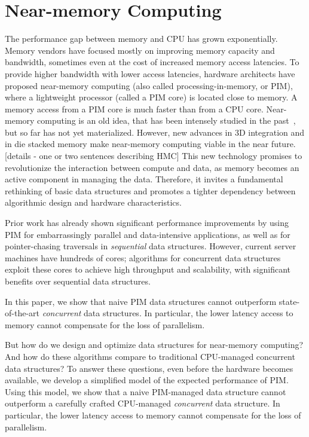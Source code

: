 \section{Near-memory Computing}

The performance gap between memory and CPU has grown exponentially. Memory vendors have focused mostly on improving memory capacity and bandwidth, sometimes even at the cost of increased memory access latencies. To provide higher bandwidth with lower access latencies, hardware architects have proposed near-memory computing (also called processing-in-memory, or PIM), where a lightweight processor (called a PIM core) is located close to memory. A memory access from a PIM core is much faster than from a CPU core. 
Near-memory computing is an old idea, that has been intensely studied in the past~\cite{}, but so far has not yet materialized. However, new advances in 3D integration and in die stacked memory make near-memory computing viable in the near future. 
[details - one or two sentences describing HMC] 
This new technology promises to revolutionize the interaction between compute and data, as memory becomes an active component in managing the data. Therefore, it invites a fundamental rethinking of basic data structures and promotes a tighter dependency between algorithmic design and hardware characteristics. 

Prior work has already shown significant performance improvements by using PIM for 
embarrassingly parallel and data-intensive applications, as well as for
pointer-chasing traversals in \emph{sequential} data structures. 
However, current server machines have hundreds of cores; algorithms for 
concurrent data structures exploit these cores to achieve high throughput and 
scalability, with significant benefits over sequential data structures. 

In this paper, we show that
  naive PIM data structures cannot outperform 
 state-of-the-art \emph{concurrent} data structures. In particular, 
the lower latency access to memory cannot compensate for the loss of 
parallelism.  











But how do we design and optimize data structures for near-memory computing? And how do these algorithms compare to traditional CPU-managed concurrent data structures? To answer these questions, even before the hardware becomes available, we develop a simplified model of the expected performance of PIM. Using this model, we show that a naive PIM-managed data structure cannot outperform a carefully crafted CPU-managed \emph{concurrent} data structure. In particular, the lower latency access to memory cannot compensate for the loss of parallelism. 
 

